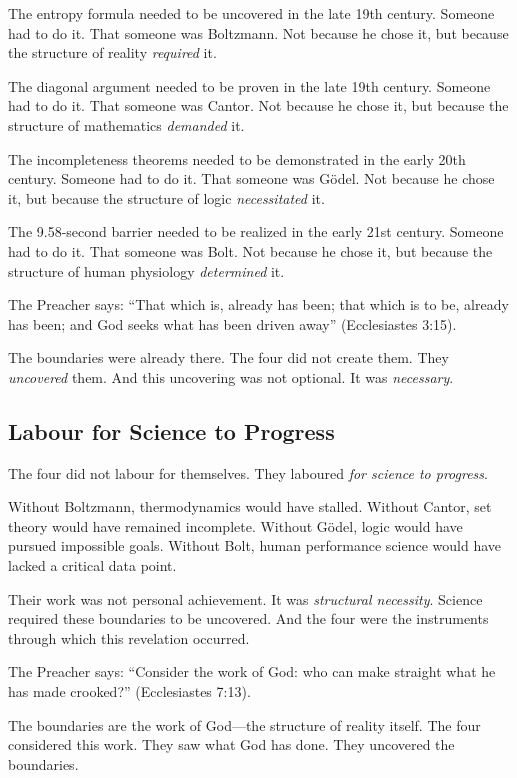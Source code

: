 \documentclass[11pt,a4paper]{article}
\begin{document}
The entropy formula needed to be uncovered in the late 19th century. Someone 
had to do it. That someone was Boltzmann. Not because he chose it, but because 
the structure of reality \emph{required} it.

The diagonal argument needed to be proven in the late 19th century. Someone 
had to do it. That someone was Cantor. Not because he chose it, but because 
the structure of mathematics \emph{demanded} it.

The incompleteness theorems needed to be demonstrated in the early 20th 
century. Someone had to do it. That someone was Gödel. Not because he chose 
it, but because the structure of logic \emph{necessitated} it.

The 9.58-second barrier needed to be realized in the early 21st century. 
Someone had to do it. That someone was Bolt. Not because he chose it, but 
because the structure of human physiology \emph{determined} it.

The Preacher says: ``That which is, already has been; that which is to be, 
already has been; and God seeks what has been driven away'' (Ecclesiastes 
3:15).

The boundaries were already there. The four did not create them. They 
\emph{uncovered} them. And this uncovering was not optional. It was 
\emph{necessary}.

\subsection{Labour for Science to Progress}

The four did not labour for themselves. They laboured \emph{for science to 
progress}.

Without Boltzmann, thermodynamics would have stalled. Without Cantor, set 
theory would have remained incomplete. Without Gödel, logic would have pursued 
impossible goals. Without Bolt, human performance science would have lacked a 
critical data point.

Their work was not personal achievement. It was \emph{structural necessity}. 
Science required these boundaries to be uncovered. And the four were the 
instruments through which this revelation occurred.

The Preacher says: ``Consider the work of God: who can make straight what he 
has made crooked?'' (Ecclesiastes 7:13).

The boundaries are the work of God—the structure of reality itself. The four 
considered this work. They saw what God has done. They uncovered the 
boundaries.
\end{document}
